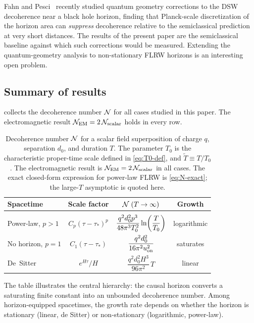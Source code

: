 Fahn and Pesci~\cite{FahnPesci:2025} recently studied quantum geometry
corrections to the DSW decoherence near a black hole horizon, finding that
Planck-scale discretization of the horizon area can \emph{suppress} decoherence
relative to the semiclassical prediction at very short distances.  The results
of the present paper are the semiclassical baseline against which such
corrections would be measured.  Extending the quantum-geometry analysis to
non-stationary FLRW horizons is an interesting open problem.

\subsection{Summary of results}
\label{sec:discussion-table}

 collects the decoherence number $\mathcal{N}$ for all cases studied
in this paper.  The electromagnetic result $\mathcal{N}_{\rm EM} = 2\,\mathcal{N}_{\rm scalar}$
holds in every row.

\begin{table}[h]
\caption{Decoherence number $\mathcal{N}$ for a scalar field superposition of charge $q$,
separation $d_0$, and duration $T$.  The parameter $T_0$ is the characteristic
proper-time scale defined in \cref{eq:T0-def}, and $\widetilde{T} \equiv T/T_0$.
The electromagnetic result is $\mathcal{N}_{\rm EM} = 2\,\mathcal{N}_{\rm scalar}$
in all cases.  The exact closed-form expression for power-law FLRW
is \cref{eq:N-exact}; the large-$T$ asymptotic is quoted here.}
\label{tab:summary}
\begin{ruledtabular}
\begin{tabular}{lccc}
Spacetime & Scale factor & $\mathcal{N}\;(T \to \infty)$ & Growth \\[2pt]
\hline\\[-6pt]
Power-law, $p > 1$ &
  $C_p(\tau - \tau_*)^p$ &
  $\dfrac{q^2 d_0^2 p^3}{48\pi^3 T_0^2}\ln\!\left(\dfrac{T}{T_0}\right)$ &
  logarithmic \\[14pt]
No horizon, $p = 1$ &
  $C_1(\tau - \tau_*)$ &
  $\dfrac{q^2 d_0^2}{16\pi^2 u_{\rm on}^2}$ &
  saturates \\[14pt]
De~Sitter &
  $e^{H\tau}/H$ &
  $\dfrac{q^2 d_0^2 H^3}{96\pi^2}\, T$ &
  linear \\[4pt]
\end{tabular}
\end{ruledtabular}
\end{table}

The table illustrates the central hierarchy: the causal horizon converts a
saturating finite constant into an unbounded decoherence number.  Among
horizon-equipped spacetimes, the growth rate depends on whether the horizon
is stationary (linear, de Sitter) or non-stationary (logarithmic, power-law).

